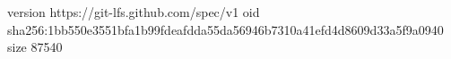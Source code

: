 version https://git-lfs.github.com/spec/v1
oid sha256:1bb550e3551bfa1b99fdeafdda55da56946b7310a41efd4d8609d33a5f9a0940
size 87540
